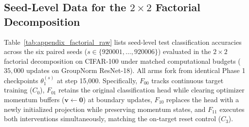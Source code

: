\documentclass[sn-mathphys,Numbered]{sn-jnl}
\begin{document}
\begin{appendices}
\clearpage
\section{Seed-Level Data for the \texorpdfstring{$2 \times 2$}{2x2} Factorial Decomposition}\label{sec:appendix_factorial}

Table~\ref{tab:appendix_factorial_raw} lists seed-level test classification accuracies across the six paired seeds ($s \in \{920001, \dots, 920006\}$) evaluated in the $2 \times 2$ factorial decomposition on CIFAR-100 under matched computational budgets ($35{,}000$ updates on GroupNorm ResNet-18). All arms fork from identical Phase 1 checkpoints $\theta_1^{(s)}$ at step 15,000. Specifically, $F_{00}$ tracks continuous target training ($C_0$), $F_{01}$ retains the original classification head while clearing optimizer momentum buffers ($\bm{v} \leftarrow \mathbf{0}$) at boundary updates, $F_{10}$ replaces the head with a newly initialized projection while preserving momentum states, and $F_{11}$ executes both interventions simultaneously, matching the on-target reset control ($C_3$).


\end{appendices}
\end{document}
